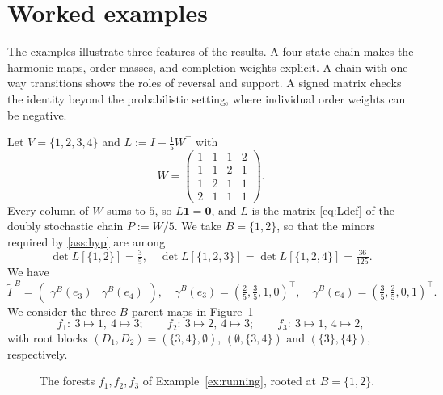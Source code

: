 \documentclass[onefignum,onetabnum]{siamart250211}
\numberwithin{theorem}{section}
\numberwithin{equation}{section}
\newcommand{\one}{\mathbf{1}}
\newcommand{\zero}{\mathbf{0}}
\begin{document}
\appendix

\section{Worked examples}\label{sec:app-examples}

The examples illustrate three features of the results. A four-state
chain makes the harmonic maps, order masses, and completion weights
explicit. A chain with one-way transitions shows the roles of
reversal and support. A signed matrix checks the identity beyond
the probabilistic setting, where individual order weights can be
negative.

\begin{example}\label{ex:running}
Let $V=\{1,2,3,4\}$ and $L:=I-\tfrac15W^{\top}$ with
\[
W=\begin{pmatrix}1&1&1&2\\1&1&2&1\\1&2&1&1\\2&1&1&1\end{pmatrix}.
\]
Every column of $W$ sums to $5$, so $L\one=\zero$, and $L$ is the
matrix \eqref{eq:Ldef} of the doubly stochastic chain $P:=W/5$. We take
$B=\{1,2\}$, so that the minors required by \cref{ass:hyp} are among
\[
\det L[\{1,2\}]=\tfrac35,\quad
\det L[\{1,2,3\}]=\det L[\{1,2,4\}]=\tfrac{36}{125}.
\] 
We have
\[
\tilde\Gamma^B=\begin{pmatrix}
\gamma^B(e_3) &\gamma^B(e_4)
\end{pmatrix},\quad
\gamma^{B}(e_3)=(\tfrac25,\tfrac35,1,0)^{\top},\quad
\gamma^{B}(e_4)=(\tfrac35,\tfrac25,0,1)^{\top}.
\]
We consider the three $B$-parent maps in Figure~\ref{fig:sm-running}
\[
f_1:\ 3\mapsto1,\ 4\mapsto3;\qquad
f_2:\ 3\mapsto2,\ 4\mapsto3;\qquad
f_3:\ 3\mapsto1,\ 4\mapsto2,
\]
with root blocks $(D_1,D_2)=(\{3,4\},\emptyset)$,
$(\emptyset,\{3,4\})$ and $(\{3\},\{4\})$, respectively. 

\begin{figure}[H]
\centering
{}
\caption{The forests $f_1,f_2,f_3$ of Example~\ref{ex:running}, rooted at
$B=\{1,2\}$.}
\label{fig:sm-running}
\end{figure}


\end{example}
\end{document}
